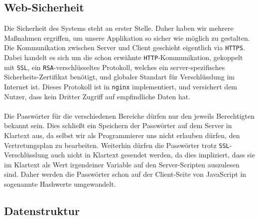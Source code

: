 \subsection{Web-Sicherheit}
Die Sicherheit des Systems steht an erster Stelle. Daher haben wir mehrere Maßnahmen ergriffen,
um unsere Applikation so sicher wie möglich zu gestalten. Die Kommunikation zwischen Server
und Client geschieht eigentlich via \texttt{HTTPS}. Dabei handelt es sich um die schon erwähnte
\texttt{HTTP}-Kommunikation, gekoppelt mit \texttt{SSL}, ein \texttt{RSA}-verschlüsseltes Protokoll,
welches ein server-spezifisches Sicherheits-Zertifikat benötigt, und globaler Standart für
Verschlüsslung im Internet ist. Dieses Protokoll ist in \texttt{nginx} implementiert, und versichert
dem Nutzer, dass kein Dritter Zugriff auf empfindliche Daten hat.\\\\
Die Passwörter für die verschiedenen Bereiche dürfen nur den jeweils Berechtigten bekannt sein. Dies
schließt ein Speichern der Passwörter auf dem Server in Klartext aus, da selbst wir als Programmierer
uns nicht erlauben dürfen, den Vertretungsplan zu bearbeiten. Weiterhin dürfen die Passwörter trotz
\texttt{SSL}-Verschlüsslung auch nicht in Klartext gesendet werden, da dies impliziert, dass sie im
Klartext als Wert irgendeiner Variable auf den Server-Scripten auszulesen sind. Daher werden die
Passwörter schon auf der Client-Seite von JavaScript in sogenannte Hashwerte umgewandelt.

\subsection{Datenstruktur}

